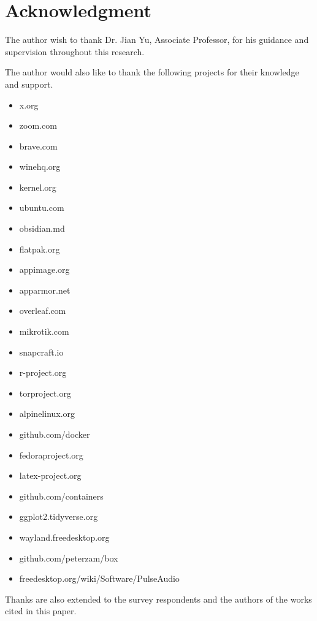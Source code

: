 \documentclass[journal,onecolumn]{IEEEtran}
\begin{document}
\newpage
\section*{Acknowledgment}


The author wish to thank Dr. Jian Yu\cite{P-Jian}, Associate Professor, for his guidance and supervision throughout this research. 

The author would also like to thank the following projects for their knowledge and support.

\begin{itemize}
\item x.org\cite{xorg}
\item zoom.com\cite{zoom}
\item brave.com\cite{brave}
\item winehq.org\cite{winehq}
\item kernel.org\cite{kernelorg}
\item ubuntu.com\cite{ubuntu}
\item obsidian.md\cite{obsidian}
\item flatpak.org\cite{flatpak}
\item appimage.org\cite{appimage}
\item apparmor.net\cite{apparmor}
\item overleaf.com\cite{overleaf}
\item mikrotik.com\cite{mikrotik}
\item snapcraft.io\cite{snapcraft}
\item r-project.org\cite{rproject}
\item torproject.org\cite{torproject}
\item alpinelinux.org\cite{alpinelinux}
\item github.com/docker\cite{docker_github}
\item fedoraproject.org\cite{fedora}
\item latex-project.org\cite{latexproject}
\item github.com/containers\cite{containers_github}
\item ggplot2.tidyverse.org\cite{ggplot2}
\item wayland.freedesktop.org\cite{wayland}
\item github.com/peterzam/box\cite{peterzambox}
\item freedesktop.org/wiki/Software/PulseAudio\cite{pulseaudio_wiki}
\end{itemize}

Thanks are also extended to the survey respondents and the authors of the works cited in this paper.
\newpage
\ifCLASSOPTIONcaptionsoff
  \newpage
\fi
\end{document}
